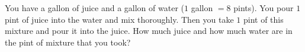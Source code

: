 You have a gallon of juice and a gallon of water ($1$ gallon $=8$ pints). You pour $1$ pint of juice into the water and mix thoroughly. Then you take $1$ pint of this mixture and pour it into the juice. How much juice and how much water are in the pint of mixture that you took?
